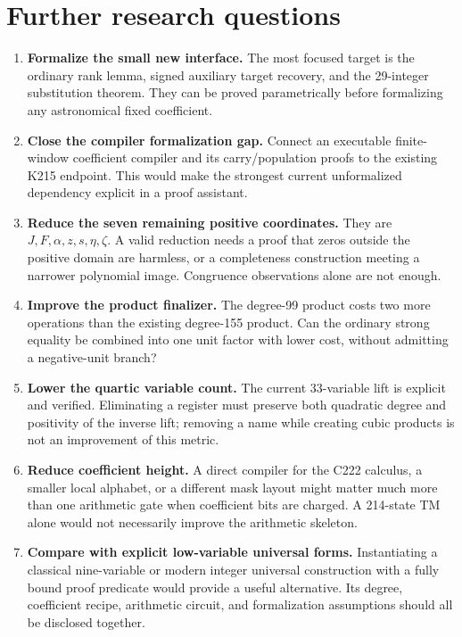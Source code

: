 \documentclass[11pt,a4paper]{article}
\theoremstyle{remark}\newtheorem{remark}[theorem]{Remark}
\begin{document}
\section{Further research questions}
\begin{enumerate}
\item \textbf{Formalize the small new interface.} The most focused target
is the ordinary rank lemma, signed auxiliary target recovery, and the
29-integer substitution theorem. They can be proved parametrically
before formalizing any astronomical fixed coefficient.
\item \textbf{Close the compiler formalization gap.} Connect an executable
finite-window coefficient compiler and its carry/population proofs to
the existing K215 endpoint. This would make the strongest current
unformalized dependency explicit in a proof assistant.
\item \textbf{Reduce the seven remaining positive coordinates.} They are
$J,F,\alpha,z,s,\eta,\zeta$. A valid reduction needs a proof that
zeros outside the positive domain are harmless, or a completeness
construction meeting a narrower polynomial image. Congruence
observations alone are not enough.
\item \textbf{Improve the product finalizer.} The degree-99 product costs
two more operations than the existing degree-155 product. Can the
ordinary strong equality be combined into one unit factor with lower
cost, without admitting a negative-unit branch?
\item \textbf{Lower the quartic variable count.} The current 33-variable
lift is explicit and verified. Eliminating a register must preserve
both quadratic degree and positivity of the inverse lift; removing
a name while creating cubic products is not an improvement of this
metric.
\item \textbf{Reduce coefficient height.} A direct compiler for the C222
calculus, a smaller local alphabet, or a different mask layout might
matter much more than one arithmetic gate when coefficient bits are
charged. A 214-state TM alone would not necessarily improve the
arithmetic skeleton.
\item \textbf{Compare with explicit low-variable universal forms.}
Instantiating a classical nine-variable or modern integer universal
construction with a fully bound proof predicate would provide a useful
alternative. Its degree, coefficient recipe, arithmetic circuit, and
formalization assumptions should all be disclosed together.
\end{enumerate}
\end{document}
